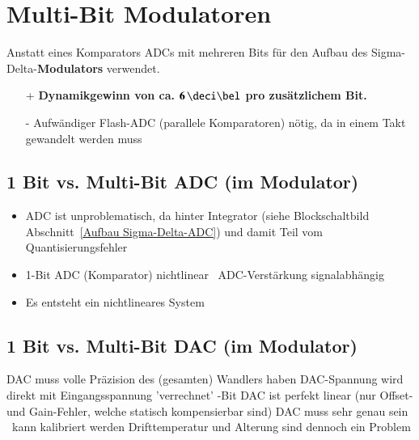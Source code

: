 
\section{Multi-Bit Modulatoren}

Anstatt eines Komparators ADCs mit mehreren Bits für den Aufbau des Sigma-Delta-\textbf{Modulators} verwendet.

\begin{minipage}[t]{0.48\columnwidth}
    \begin{itemize}
        \item[+] \textbf{Dynamikgewinn von ca. $\bm{6 \, \deci \bel }$ pro zusätzlichem Bit.}
    \end{itemize}
\end{minipage}
\hfill
\begin{minipage}[t]{0.48\columnwidth}
    \raggedright%
    \begin{itemize}
        \item[-] Aufwändiger Flash-ADC (parallele Komparatoren) nötig, da in einem Takt gewandelt werden muss
    \end{itemize}
\end{minipage}


\subsection{1 Bit vs. Multi-Bit ADC (im Modulator)}

\begin{itemize}
    \item ADC ist unproblematisch, da hinter Integrator (siehe Blockschaltbild Abschnitt~\ref{Aufbau Sigma-Delta-ADC}) und damit 
        Teil vom Quantisierungsfehler
    \item 1-Bit ADC (Komparator) nichtlinear \textrightarrow\ ADC-Verstärkung signalabhängig
    \item Es entsteht ein nichtlineares System
\end{itemize}


\subsection{1 Bit vs. Multi-Bit DAC (im Modulator)}

\begin{outline}
    \1 DAC muss volle Präzision des (gesamten) Wandlers haben
        \2 DAC-Spannung wird direkt mit Eingangsspannung 'verrechnet'
    -Bit DAC ist perfekt linear (nur Offset- und Gain-Fehler, welche statisch kompensierbar sind)
    \1 DAC muss sehr genau sein \textrightarrow\ kann kalibriert werden
        \2 Drifttemperatur und Alterung sind dennoch ein Problem
\end{outline}


